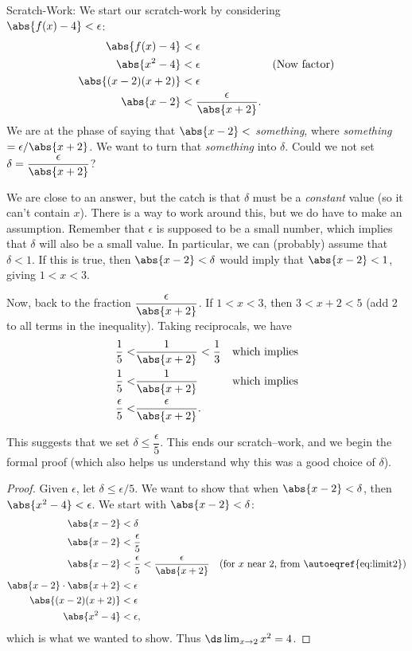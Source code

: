 {Scratch-Work:
We start our scratch-work by considering\\
$\abs{f(x)-4}<\epsilon$:
\begin{align}
\abs{f(x)-4} &< \epsilon \notag\\
\abs{x^2-4} &< \epsilon & \text{(Now factor)}\notag\\
\abs{(x-2)(x+2)} &< \epsilon \notag\\
\abs{x-2} &<\frac{\epsilon}{\abs{x+2}}.\label{eq:lim1}
\end{align}
We are at the phase of saying that $\abs{x-2}<$ \textit{something}, where \textit{something}$=\epsilon/\abs{x+2}$. We want to turn that \textit{something} into $\delta$. Could we not set $\delta = \dfrac{\epsilon}{\abs{x+2}}$?  

We are close to an answer, but the catch is that $\delta$ must be a \textit{constant} value (so it can't contain $x$).  There is a way to work around this, but we do have to make an assumption.  Remember that $\epsilon$ is supposed to be a small number, which implies that $\delta$ will also be a small value.  In particular, we can (probably) assume that $\delta < 1$.  If this is true, then $\abs{x-2}< \delta$ would imply that $\abs{x-2}< 1$, giving $1 < x < 3$.  

Now, back to the fraction $\dfrac{\epsilon}{\abs{x+2}}$.  If $1<x<3$, then $3<x+2<5$ (add 2 to all terms in the inequality).  Taking reciprocals, we have 
\begin{align}
\frac15 <& \frac1{\abs{x+2}} < \frac 13 & \text{which implies}\notag\\
\frac15 <& \frac1{\abs{x+2}} & \text{which implies}\notag\\
\frac\epsilon5<&\frac{\epsilon}{\abs{x+2}}\text{.}\label{eq:limit2}
\end{align}

This suggests that we set 
$\delta \leq \dfrac{\epsilon}{5}$. This ends our scratch--work, and we begin the formal proof (which also helps us understand why this was a good choice of $\delta$).

\begin{proof}
Given $\epsilon$, let $\delta \leq \epsilon/5$. We want to show that when $\abs{x-2}<\delta$, then $\abs{x^2-4}<\epsilon$. We start with $\abs{x-2}<\delta$:
\begin{align*}
\abs{x-2} &< \delta \\
\abs{x-2} &< \frac{\epsilon}5\\
\abs{x-2} &< \frac\epsilon5 < \frac{\epsilon}{\abs{x+2}} & \text{(for $x$ near 2, from \autoeqref{eq:limit2})}\\
\abs{x-2}\cdot\abs{x+2} &< \epsilon\\
\abs{(x-2)(x+2)} &< \epsilon\\
\abs{x^2-4} &<\epsilon,
\end{align*}
which is what we wanted to show. Thus $\ds \lim_{x\to 2}x^2 = 4$.
\end{proof}

}

